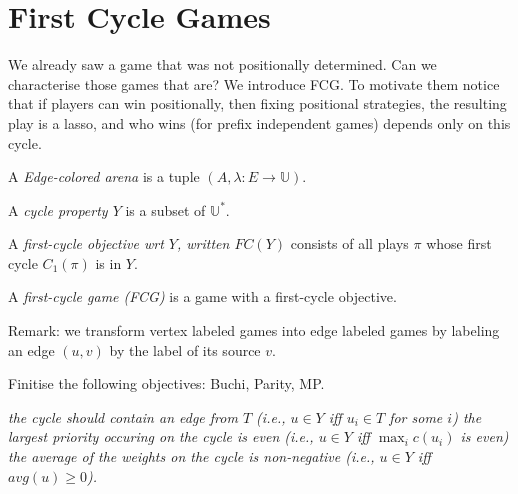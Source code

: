 \documentclass[a4paper,10pt]{article}
\begin{document}
\section{First Cycle Games}


We already saw a game that was not positionally determined. Can we characterise those games that are? We introduce FCG. To motivate them notice that if players can win positionally, then fixing positional strategies, the resulting play is a lasso, and who wins (for prefix independent games) depends only on this cycle. 

\begin{definition}
A \emph{Edge-colored arena} is a tuple $(A,\lambda:E \to \mathbb{U})$.

A \emph{cycle property $Y$} is a subset of $\mathbb{U}^*$.

A \emph{first-cycle objective wrt $Y$, written $FC(Y)$} consists of all plays $\pi$ whose first cycle $C_1(\pi)$ is in $Y$. 

A \emph{first-cycle game (FCG)} is a game with a first-cycle objective.

\end{definition}

% 
%  

Remark: we transform vertex labeled games into edge labeled games by labeling an edge $(u,v)$ by the label of its source $v$.

Finitise the following objectives: Buchi, Parity, MP. 
\begin{example}
 \it
 \- the cycle should contain an edge from $T$ (i.e., $u \in Y$ iff $u_i \in T$ for some $i$)
 \- the largest priority occuring on the cycle is even (i.e., $u \in Y$ iff $\max_i c(u_i)$ is even)
 \- the average of the weights on the cycle is non-negative (i.e., $u \in Y$ iff $avg(u) \geq 0$).
\ti
\end{example}
\end{document}
